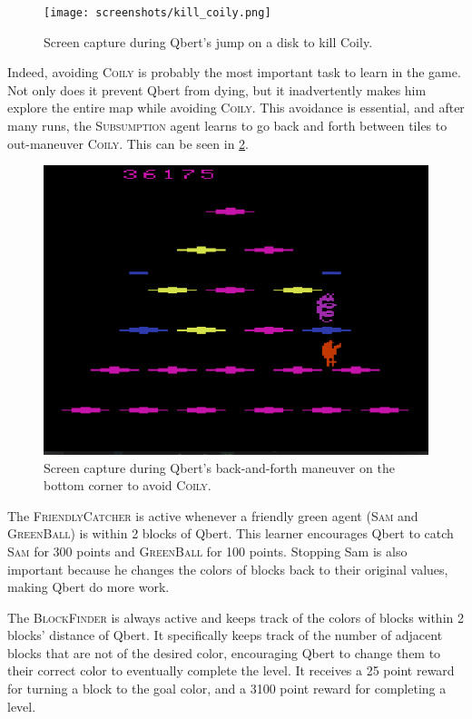 \documentclass[a4paper,titlepage]{article}
\begin{document}
	\begin{figure}[!htb]
		\centering
		\texttt{[image: screenshots/kill\_coily.png]}
		\caption
		{Screen capture during Qbert's jump on a disk to kill Coily.}
		\label{fig:kill_coily}
	\end{figure}

	Indeed, avoiding \textsc{Coily} is probably the most important task to learn in the game. Not only does it prevent Qbert from dying, but it inadvertently makes him explore the entire map while avoiding \textsc{Coily}. This avoidance is essential, and after many runs, the \textsc{Subsumption} agent learns to go back and forth between tiles to out-maneuver \textsc{Coily}. This can be seen in \cref{fig:avoid_coily}.
	
	\begin{figure}[!htb]
		\centering
		\includegraphics[width=\columnwidth]{screenshots/avoid_coily.png}
		\caption
		{Screen capture during Qbert's back-and-forth maneuver on the bottom corner to avoid \textsc{Coily}.}
		\label{fig:avoid_coily}
	\end{figure}
	
	The \textsc{FriendlyCatcher} is active whenever a friendly green agent (\textsc{Sam} and \textsc{GreenBall}) is within 2 blocks of Qbert. This learner encourages Qbert to catch \textsc{Sam} for 300 points and \textsc{GreenBall} for 100 points. Stopping Sam is also important because he changes the colors of blocks back to their original values, making Qbert do more work.
	
	The \textsc{BlockFinder} is always active and keeps track of the colors of blocks within 2 blocks' distance of Qbert. It specifically keeps track of the number of adjacent blocks that are not of the desired color, encouraging Qbert to change them to their correct color to eventually complete the level. It receives a 25 point reward for turning a block to the goal color, and a 3100 point reward for completing a level.
	
\end{document}
